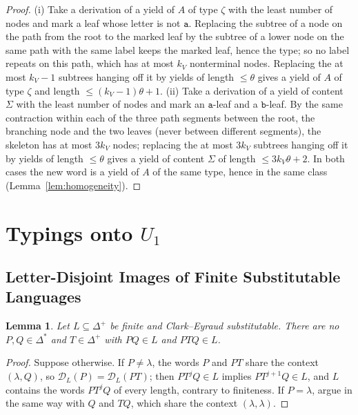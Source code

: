 \documentclass[11pt]{article}
\numberwithin{equation}{section}
\theoremstyle{plain}
\newtheorem{lemma}[theorem]{Lemma}
\theoremstyle{definition}
\theoremstyle{remark}
\theoremstyle{plain}
\newcommand{\D}{\mathcal{D}}
\newcommand{\eps}{\lambda}
\begin{document}
\begin{proof}
(i) Take a derivation of a yield of $A$ of type $\zeta$ with the least number of
nodes and mark a leaf whose letter is not $\mathtt a$.  Replacing the subtree of a
node on the path from the root to the marked leaf by the subtree of a lower node
on the same path with the same label keeps the marked leaf, hence the type; so no label repeats on
this path, which has at most $k_V$ nonterminal nodes.  Replacing the at most
$k_V-1$ subtrees hanging off it by yields of length $\le\theta$ gives a yield of
$A$ of type $\zeta$ and length $\le(k_V-1)\theta+1$.  (ii) Take a derivation of a
yield of content $\Sigma$ with the least number of nodes and mark an $\mathtt
a$-leaf and a $\mathtt b$-leaf.  By the same contraction within each of the three
path segments between the root, the branching node and the two leaves (never
between different segments), the skeleton has at most
$3k_V$ nodes; replacing the at most $3k_V$ subtrees hanging off it by yields of
length $\le\theta$ gives a yield of content $\Sigma$ of length $\le3k_V\theta+2$.
In both cases the new word is a yield of $A$ of the same type, hence in the same
class (Lemma~\ref{lem:homogeneity}).
\end{proof}

\section{Typings onto \texorpdfstring{$U_1$}{U1}}
\label{app:u1}

\subsection{Letter-Disjoint Images of Finite Substitutable Languages}

\begin{lemma}\label{lem:app-u1-insertion}
Let $L\subseteq\Delta^+$ be finite and Clark--Eyraud substitutable.  There are no
$P,Q\in\Delta^*$ and $T\in\Delta^+$ with $PQ\in L$ and $PTQ\in L$.
\end{lemma}

\begin{proof}
Suppose otherwise.  If $P\ne\eps$, the words $P$ and $PT$ share the context
$(\eps,Q)$, so $\D_L(P)=\D_L(PT)$; then $PT^jQ\in L$ implies $PT^{j+1}Q\in L$, and
$L$ contains the words $PT^jQ$ of every length, contrary to finiteness.  If
$P=\eps$, argue in the same way with $Q$ and $TQ$, which share the context
$(\eps,\eps)$.
\end{proof}
\end{document}
